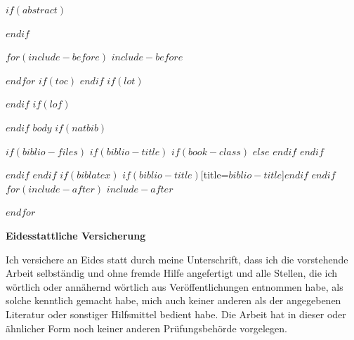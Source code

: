 \documentclass[$if(fontsize)$$fontsize$,$endif$$if(lang)$$lang$,$endif$$if(papersize)$$papersize$,$endif$$for(classoption)$$classoption$$sep$,$endfor$]{$documentclass$}
\begin{document}
\restoregeometry

$if(abstract)$
\begin{abstract}
$abstract$
\end{abstract}
$endif$

$for(include-before)$
$include-before$

$endfor$
$if(toc)$
{
\hypersetup{linkcolor=black}
\setcounter{tocdepth}{$toc-depth$}
\tableofcontents
}
$endif$
$if(lot)$
\newpage
\listoftables
$endif$
$if(lof)$
\newpage
\listoffigures
$endif$
\newpage
{} 
$body$
$if(natbib)$

$if(biblio-files)$
$if(biblio-title)$
$if(book-class)$
\renewcommand\bibname{$biblio-title$}
$else$
\renewcommand\refname{$biblio-title$}
$endif$
$endif$


$endif$
$endif$
$if(biblatex)$
\renewcommand*{\mkbibnamefamily}[1]{\textbf{#1}}
\renewcommand*{\mkbibnamegiven}[1]{\textbf{#1}}
\renewcommand*{\mkbibnameprefix}[1]{\textbf{#1}}
\renewcommand*{\mkbibnamesuffix}[1]{\textbf{#1}}
\printbibliography$if(biblio-title)$[title=$biblio-title$]$endif$
$endif$
$for(include-after)$
$include-after$

$endfor$

\newpage
\textbf{Eidesstattliche Versicherung}

\bigskip

Ich versichere an Eides statt durch meine Unterschrift, dass ich die vorstehende Arbeit selbständig und ohne fremde Hilfe angefertigt und alle Stellen, die ich wörtlich oder annähernd wörtlich aus Veröffentlichungen entnommen habe, als solche kenntlich gemacht habe, mich auch keiner anderen als der angegebenen Literatur oder sonstiger Hilfsmittel bedient habe. Die Arbeit hat in dieser oder ähnlicher Form noch keiner anderen Prüfungsbehörde vorgelegen.

\vspace{1cm}
\rule{0pt}{2\baselineskip} %
\par\noindent{} \hfill\makebox[2.25in]{\hrulefill}%
\par\noindent\makebox[2.25in][l]{} \hfill{}%
\end{document}
